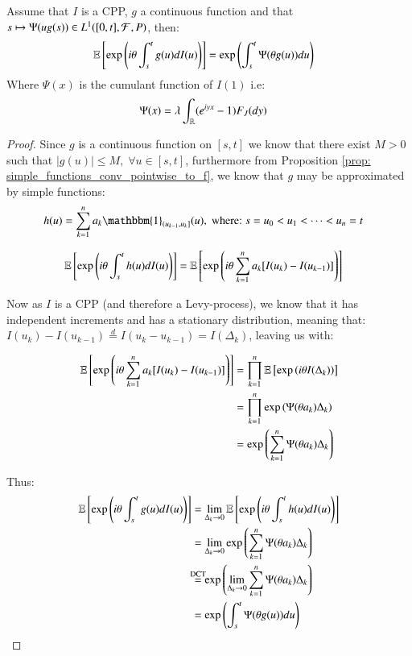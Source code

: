 \begin{proposition}
\label{prop: Integral_g(s)dI(s)}
Assume that $I$ is a CPP, $g$ a continuous function and that 
$s\mapsto \Psi(ug(s)) \in L^{1}([0,t], \mathcal{F}, P)$, then: 
\begin{align*}
\mathbb{E}\left[
\exp\left(
i\theta\int_{s}^{t}g(u)dI(u)
\right)
\right] 
&= 
\exp\left(
\int_{s}^{t}\Psi(\theta g(u))du
\right)
\end{align*}
Where $\Psi(x)$ is the cumulant function of $I(1)$ i.e: 
\begin{align*}
\Psi(x) &= 
\lambda \int_{\mathbb{R}}(e^{iyx}-1)F_{J}(dy)
\end{align*}
\end{proposition}

\begin{proof}
Since $g$ is a continuous function on $[s,t]$ we know that there exist $M>0$ such that $|g(u)| \leq M,\; \forall u \in [s,t]$, furthermore from Proposition \ref{prop: simple_functions_conv_pointwise_to_f}, we know that $g$ may be approximated by simple functions: 
\begin{align*}
h(u) &= \sum_{k=1}^{n}a_{k}\mathbbm{1}_{(u_{k-1}, u_{k}]}(u), \;\text{where:}\; s = u_{0} < u_{1} < \dots < u_{n} = t  
\end{align*}

\begin{align*}
\mathbb{E}\left[
\exp\left(
i\theta \int_{s}^{t}h(u)dI(u)
\right)
\right]
&= 
\mathbb{E}\left[
\exp\left(
i\theta \sum_{k=1}^{n}a_{k}[I(u_{k}) - I(u_{k-1})]
\right)
\right]
\end{align*}

Now as $I$ is a CPP (and therefore a Levy-process), we know that it has independent increments and has a stationary distribution, meaning that: 
$I(u_{k}) - I(u_{k-1}) \stackrel{d}{=} I(u_{k}-u_{k-1}) = I(\Delta_{k})$, leaving us with: 

\newpage 

\begin{align*}
\mathbb{E}\left[
\exp\left(
i\theta \sum_{k=1}^{n}a_{k}[I(u_{k}) - I(u_{k-1})]
\right)
\right] 
&= 
\prod_{k=1}^{n}\mathbb{E}\left[
\exp\left(
i\theta I(\Delta_{k})
\right)
\right] \\ 
&= 
\prod_{k=1}^{n}\exp\left(
\Psi(\theta a_{k})\Delta_{k}
\right) \\ 
&= 
\exp\left(
\sum_{k=1}^{n}\Psi(\theta a_{k})\Delta_{k}
\right)
\end{align*}

Thus: 
\begin{align*}
\E\left[
\exp\left(
i\theta\int_{s}^{t}g(u)dI(u)
\right)
\right]
&= 
\lim\limits_{\Delta_{k}\to 0}\E\left[
\exp\left(
i\theta\int_{s}^{t}h(u)dI(u)
\right)
\right] \\ 
&= 
\lim\limits_{\Delta_{k}\to 0}
\exp\left(
\sum_{k=1}^{n}\Psi(\theta a_{k})\Delta_{k}
\right) \\ 
&\stackrel{\mathclap{\mathrm{DCT}}}{=} 
\exp\left(
\lim\limits_{\Delta_{k}\to 0}
\sum_{k=1}^{n}\Psi(\theta a_{k})\Delta_{k}
\right) \\ 
&= 
\exp\left(
\int_{s}^{t}\Psi(\theta g(u))du
\right)
\end{align*}

\end{proof}

